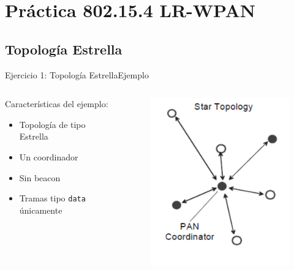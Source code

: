 \documentclass[aspectratio=169]{beamer}
\begin{document}
%
\section{Práctica 802.15.4 LR-WPAN}

\subsection[Estrella]{Topología Estrella}

\begin{frame}[t]{Ejercicio 1: Topología Estrella}{Ejemplo}
\begin{columns}[t]
    \begin{column}{.5\textwidth}
        \begin{minipage}[t][0.7\textheight][s]{\columnwidth}
        Características del ejemplo:
        \vspace{30px}
            \begin{itemize}
	            \item Topología de tipo Estrella
	            \vspace{5px}
				\item Un coordinador
				\vspace{5px}            
	            \item Sin beacon
				\vspace{5px}
	            \item Tramas tipo \texttt{data} únicamente
	            \vspace{5px}
        		\end{itemize}
        \end{minipage}
    \end{column}
    \begin{column}{.5\textwidth}
        \begin{minipage}[t][0.7\textheight][s]{\columnwidth}
            \begin{figure}[H]
                \includegraphics[width=.6\textwidth]{./imagenes/Topology-Star}

\end{figure}
\end{minipage}
\end{column}
\end{columns}
\end{frame}
\end{document}
